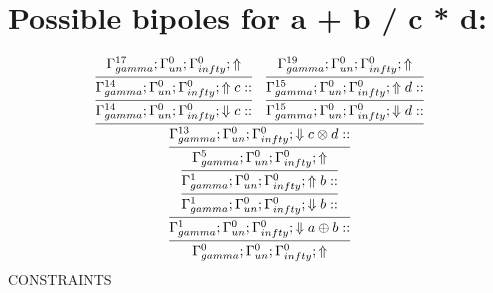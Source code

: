 \documentclass[a4paper, 11pt]{article}
\begin{document}
\section{Possible bipoles for a + b / c * d:} 

\[
\infer{\Gamma_{ gamma}^{0} ; \Gamma_{un}^{0} ; \Gamma_{ infty}^{0} ;  \Uparrow }
{\infer{\Gamma_{ gamma}^{1} ; \Gamma_{un}^{0} ; \Gamma_{ infty}^{0} ;  \Downarrow a \oplus b :: }
{\infer{\Gamma_{ gamma}^{1} ; \Gamma_{un}^{0} ; \Gamma_{ infty}^{0} ;  \Downarrow b :: }
{\infer{\Gamma_{ gamma}^{1} ; \Gamma_{un}^{0} ; \Gamma_{ infty}^{0} ;  \Uparrow b :: }
{\infer{\Gamma_{ gamma}^{5} ; \Gamma_{un}^{0} ; \Gamma_{ infty}^{0} ;  \Uparrow }
{\infer{\Gamma_{ gamma}^{13} ; \Gamma_{un}^{0} ; \Gamma_{ infty}^{0} ;  \Downarrow c \otimes d :: }
{\infer{\Gamma_{ gamma}^{14} ; \Gamma_{un}^{0} ; \Gamma_{ infty}^{0} ;  \Downarrow c :: }
{\infer{\Gamma_{ gamma}^{14} ; \Gamma_{un}^{0} ; \Gamma_{ infty}^{0} ;  \Uparrow c :: }
{\Gamma_{ gamma}^{17} ; \Gamma_{un}^{0} ; \Gamma_{ infty}^{0} ;  \Uparrow }}
&
\infer{\Gamma_{ gamma}^{15} ; \Gamma_{un}^{0} ; \Gamma_{ infty}^{0} ;  \Downarrow d :: }
{\infer{\Gamma_{ gamma}^{15} ; \Gamma_{un}^{0} ; \Gamma_{ infty}^{0} ;  \Uparrow d :: }
{\Gamma_{ gamma}^{19} ; \Gamma_{un}^{0} ; \Gamma_{ infty}^{0} ;  \Uparrow }}}}}}}}
\]
CONSTRAINTS
\end{document}
